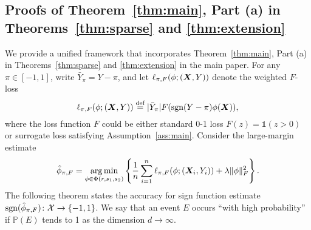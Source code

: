 \documentclass[11pt]{article}
\theoremstyle{plain}
\theoremstyle{definition}
\def\sign{\textup{sgn}}
\def\shift{\bar Y_\pi}
\begin{document}
\subsection{Proofs of Theorem~\ref{thm:main}, Part (a) in Theorems~\ref{thm:sparse} and \ref{thm:extension}}\label{sec:sign}
We provide a unified framework that incorporates Theorem~\ref{thm:main}, Part (a) in Theorems~\ref{thm:sparse} and \ref{thm:extension} in the main paper. For any $\pi\in[-1,1]$, write $\shift=Y-\pi$, and let $\ell_{\pi,F}(\phi; (\bm X, Y))$ denote the weighted $F$-loss
\[
\ell_{\pi,F}(\phi; (\mX, Y))\stackrel{\text{def}}{=}|\shift| F(\sign(Y-\pi)\phi(\mX)),
\]
where the loss function $F$ could be either standard 0-1 loss $F(z)=\mathds{1}(z>0)$ or surrogate loss satisfying Assumption~\ref{ass:main}. Consider the large-margin estimate
\begin{align}\label{eq:phi}
\hat \phi_{\pi,F}=\operatorname*{arg\,min}_{\phi \in\Phi(r,s_1,s_2)}\left\{ {1\over n}\sum_{i=1}^n \ell_{\pi,F}(\phi; (\bm X_i,Y_i))+ \lambda \lVert\phi\rVert_F^2\right\}.
\end{align}
The following theorem states the accuracy for sign function estimate $\sign(\hat \phi_{\pi,F})\colon \tX\to\{-1,1\}$. We say that an event $E$ occurs ``with high probability'' if $\mathbb{P}(E)$ tends to 1 as the dimension $d\to \infty$.
\end{document}
